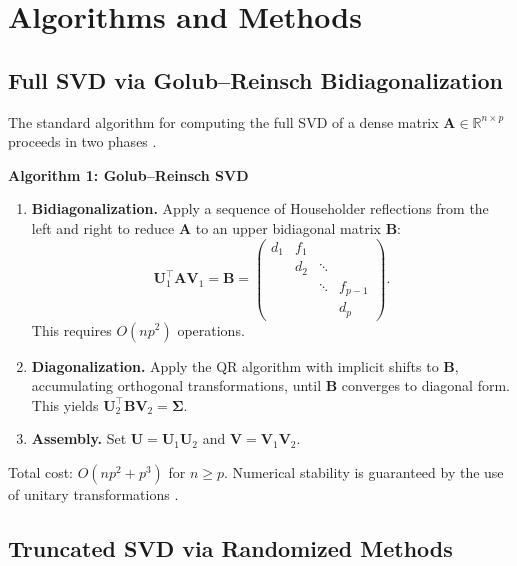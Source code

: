 \documentclass[conference]{IEEEtran}
\begin{document}
\section{Algorithms and Methods}
\label{sec:algorithms}

\subsection{Full SVD via Golub--Reinsch Bidiagonalization}

The standard algorithm for computing the full SVD of a dense matrix $\mathbf{A} \in \mathbb{R}^{n \times p}$ proceeds in two phases \cite{golub1965, golub2013}.

\textbf{Algorithm 1: Golub--Reinsch SVD}
\begin{enumerate}
  \item \textbf{Bidiagonalization.} Apply a sequence of Householder reflections from the left and right to reduce $\mathbf{A}$ to an upper bidiagonal matrix $\mathbf{B}$:
  \begin{equation}
    \mathbf{U}_1^\top \mathbf{A} \mathbf{V}_1 = \mathbf{B} = \begin{pmatrix} d_1 & f_1 & & \\ & d_2 & \ddots & \\ & & \ddots & f_{p-1} \\ & & & d_p \end{pmatrix}.
  \end{equation}
  This requires $O(np^2)$ operations.
  \item \textbf{Diagonalization.} Apply the QR algorithm with implicit shifts to $\mathbf{B}$, accumulating orthogonal transformations, until $\mathbf{B}$ converges to diagonal form. This yields $\mathbf{U}_2^\top \mathbf{B} \mathbf{V}_2 = \mathbf{\Sigma}$.
  \item \textbf{Assembly.} Set $\mathbf{U} = \mathbf{U}_1\mathbf{U}_2$ and $\mathbf{V} = \mathbf{V}_1\mathbf{V}_2$.
\end{enumerate}
Total cost: $O(np^2 + p^3)$ for $n \geq p$. Numerical stability is guaranteed by the use of unitary transformations \cite{trefethen1997}.

\subsection{Truncated SVD via Randomized Methods}
\end{document}
